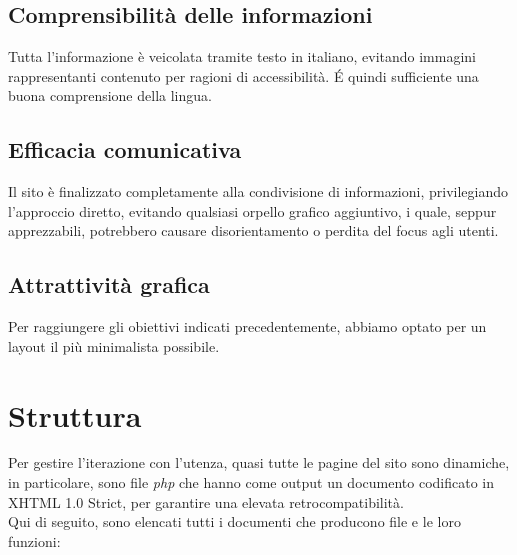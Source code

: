 \documentclass{tecweb}
\begin{document}
	\subsection{Comprensibilità delle informazioni}
	Tutta l'informazione è veicolata tramite testo in italiano, evitando immagini rappresentanti contenuto per ragioni di accessibilità. \'E quindi sufficiente una buona comprensione della lingua.
	\subsection{Efficacia comunicativa}
	Il sito è finalizzato completamente alla condivisione di informazioni, privilegiando l'approccio diretto, evitando qualsiasi orpello grafico aggiuntivo, i quale, seppur apprezzabili, potrebbero causare disorientamento o perdita del focus agli utenti.
	\subsection{Attrattività grafica}
	Per raggiungere gli obiettivi indicati precedentemente, abbiamo optato per un layout il più minimalista possibile.
	\newpage
	\section{Struttura}
	Per gestire l'iterazione con l'utenza, quasi tutte le pagine del sito sono dinamiche, in particolare, sono file \textit{php} che hanno come output un documento codificato in XHTML 1.0 Strict, per garantire una elevata retrocompatibilità. \\
	Qui di seguito, sono elencati tutti i documenti che producono file  e le loro funzioni:
\end{document}
